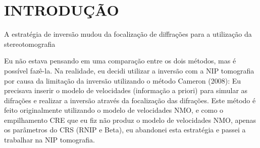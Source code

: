 \chapter{INTRODUÇÃO}
\label{cap1}

A estratégia de inversão mudou da focalização de diffrações para a utilização da stereotomografia

Eu não estava pensando em uma comparação entre os dois métodos, mas é possível fazê-la. Na realidade, eu decidi utilizar a inversão com a NIP tomografia por causa da limitação da inversão utilizando o método Cameron (2008): Eu precisava inserir o modelo de velocidades (informação a priori) para simular as difrações e realizar a inversão através da focalização das difrações. Este método é feito originalmente utilizando o modelo de velocidades NMO, e como o empilhamento CRE que eu fiz não produz o modelo de velocidades NMO, apenas os parâmetros do CRS (RNIP e Beta), eu abandonei esta estratégia e passei a trabalhar na NIP tomografia.





